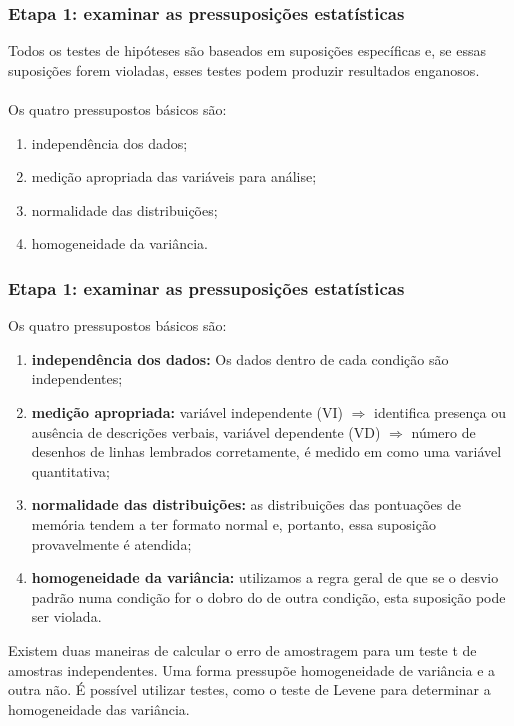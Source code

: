 \documentclass[11pt]{beamer}
\begin{document}
\begin{frame}
\frametitle{Etapa 1: examinar as pressuposições estatísticas}

Todos os testes de hipóteses são baseados em suposições específicas e, se essas suposições forem violadas, esses testes podem produzir resultados enganosos.\\~\\
Os quatro pressupostos básicos são:

\begin{enumerate}
\item independência dos dados;
\item medição apropriada das variáveis para análise;
\item normalidade das distribuições;
\item homogeneidade da variância.
\end{enumerate}

\end{frame}

\begin{frame}
\frametitle{Etapa 1: examinar as pressuposições estatísticas}

Os quatro pressupostos básicos são:

\begin{enumerate}
\item \textbf{independência dos dados:} Os dados dentro de cada condição são independentes;
\item \textbf{medição apropriada:} variável independente (VI) \(\Rightarrow\) identifica presença ou ausência de descrições verbais, variável dependente (VD) \(\Rightarrow\) número de desenhos de linhas lembrados corretamente, é medido em como uma variável quantitativa;
\item \textbf{normalidade das distribuições:} as distribuições das pontuações de memória tendem a ter formato normal e, portanto, essa suposição provavelmente é atendida;
\item \textbf{homogeneidade da variância:} utilizamos a regra geral de que se o desvio padrão numa condição for o dobro do de outra condição, esta suposição pode ser violada.
\end{enumerate}

Existem duas maneiras de calcular o erro de amostragem para um teste t de amostras independentes. Uma forma pressupõe homogeneidade de variância e a outra não. É possível utilizar testes, como o teste de Levene para determinar a homogeneidade das variância.

\end{frame}
\end{document}
